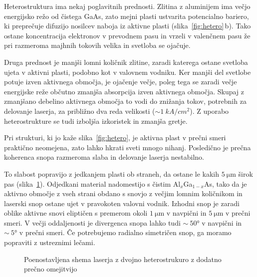 Heterostruktura ima nekaj poglavitnih prednosti. Zlitina z aluminijem ima večjo 
energijsko režo od čistega GaAs, zato mejni plasti ustvarita potencialno bariero, 
ki preprečuje difuzijo nosilcev naboja iz aktivne plasti (slika~\ref{fig:hetero}\,b). Tako ostane koncentracija 
elektronov v prevodnem pasu in vrzeli v valenčnem pasu že pri razmeroma majhnih tokovih
velika in svetloba se ojačuje. 

Druga prednost je manjši lomni količnik zlitine, 
zaradi katerega ostane svetloba ujeta v aktivni plasti, podobno kot v valovnem 
vodniku. Ker manjši del svetlobe potuje izven aktivnega območja, je ojačenje večje,
poleg tega se zaradi večje energijske reže občutno zmanjša absorpcija izven aktivnega območja.
Skupaj z zmanjšano debelino aktivnega območja to vodi do znižanja tokov, 
potrebnih za delovanje laserja, za približno dva reda velikosti ($\sim 1~\si{kA}/\si{cm}^2$). 
Z uporabo heterostrukture se tudi izboljša izkoristek in zmanjša gretje.  

Pri strukturi, ki jo kaže slika~\ref{fig:hetero}, je aktivna plast v prečni smeri praktično neomejena, 
zato lahko hkrati sveti mnogo nihanj. Posledično je prečna koherenca snopa razmeroma slaba in 
delovanje laserja nestabilno. 

To slabost popravijo z jedkanjem plasti ob straneh, da ostane le
kakih $5~\si{\micro\meter}$ širok pas (slika~\ref{fig:heshema}). Odjedkani material nadomestijo s čistim Al$_x$Ga$_{1-x}$As, 
tako da je aktivno območje z vseh strani obdano s snovjo z večjim lomnim količnikom in laserski
snop ostane ujet v pravokoten valovni vodnik. Izhodni snop je zaradi oblike aktivne snovi eliptičen s 
premerom okoli $1~\si{\micro\meter}$ v navpični in $5~\si{\micro\meter}$ v prečni smeri. 
V večji oddaljenosti je divergenca snopa lahko tudi $\sim~50\si{\degree}$ v navpični in $\sim~5\si{\degree}$ 
v prečni smeri. Če potrebujemo radialno simetričen snop, ga moramo popraviti z ustreznimi 
lečami.
\begin{figure}[ht]
\centering
\def\svgwidth{85truemm} 

\caption{Poenostavljena shema laserja z dvojno heterostrukuro z dodatno prečno omejitvijo
}
\label{fig:heshema}
\end{figure}


